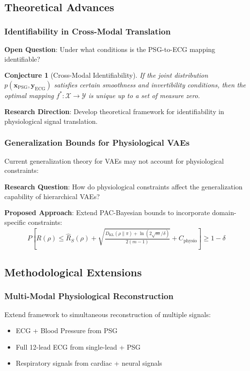 \documentclass[11pt]{article}
\newtheorem{conjecture}{Conjecture}
\begin{document}
\subsection{Theoretical Advances}

\subsubsection{Identifiability in Cross-Modal Translation}
\textbf{Open Question}: Under what conditions is the PSG-to-ECG mapping identifiable?

\begin{conjecture}[Cross-Modal Identifiability]
If the joint distribution $p(\mathbf{x}_{\text{PSG}}, \mathbf{y}_{\text{ECG}})$ satisfies certain smoothness and invertibility conditions, then the optimal mapping $f^*: \mathcal{X} \rightarrow \mathcal{Y}$ is unique up to a set of measure zero.
\end{conjecture}

\textbf{Research Direction}: Develop theoretical framework for identifiability in physiological signal translation.

\subsubsection{Generalization Bounds for Physiological VAEs}
Current generalization theory for VAEs may not account for physiological constraints:

\textbf{Research Question}: How do physiological constraints affect the generalization capability of hierarchical VAEs?

\textbf{Proposed Approach}: Extend PAC-Bayesian bounds to incorporate domain-specific constraints:
\begin{align}
P\left[ R(\rho) \leq \hat{R}_S(\rho) + \sqrt{\frac{D_{\text{KL}}(\rho \| \pi) + \ln(2\sqrt{m}/\delta)}{2(m-1)}} + C_{\text{physio}} \right] \geq 1-\delta
\end{align}

\subsection{Methodological Extensions}

\subsubsection{Multi-Modal Physiological Reconstruction}
Extend framework to simultaneous reconstruction of multiple signals:
\begin{itemize}
    \item ECG + Blood Pressure from PSG
    \item Full 12-lead ECG from single-lead + PSG
    \item Respiratory signals from cardiac + neural signals
\end{itemize}
\end{document}
